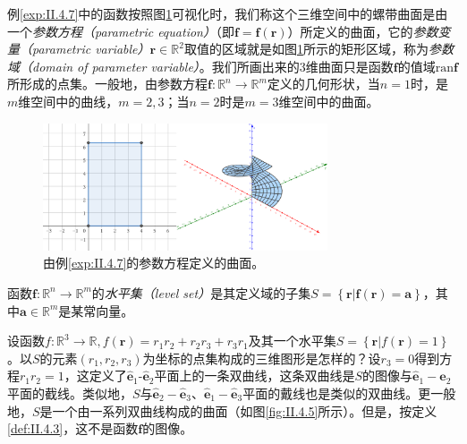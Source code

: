 \documentclass[main.tex]{subfiles}
\begin{document}
例\ref{exp:II.4.7}中的函数按照图\ref{fig:II.4.4}可视化时，我们称这个三维空间中的螺带曲面是由一个\emph{参数方程（parametric equation）}（即$\mathbf{f}=\mathbf{f}\left(\mathbf{r}\right)$）所定义的曲面，它的\emph{参数变量（parametric variable）}$\mathbf{r}\in\mathbb{R}^2$取值的区域就是如图\ref{fig:II.4.4}所示的矩形区域，称为\emph{参数域（domain of parameter variable）}。我们所画出来的3维曲面只是函数$\mathbf{f}$的值域$\mathrm{ran}\mathbf{f}$所形成的点集。一般地，由参数方程$\mathbf{f}:\mathbb{R}^n\rightarrow\mathbb{R}^m$定义的几何形状，当$n=1$时，是$m$维空间中的曲线，$m=2,3$；当$n=2$时是$m=3$维空间中的曲面。

\begin{figure}[h]
    \centering
    \includegraphics[width=0.75\textwidth]{images/II.4.4.png}
    \caption{由例\ref{exp:II.4.7}的参数方程定义的曲面。}
    \label{fig:II.4.4}
\end{figure}
\begin{definition}[函数的水平集]
    函数$\mathbf{f}:\mathbb{R}^n\rightarrow\mathbb{R}^m$的\emph{水平集（level set）}是其定义域的子集$S=\left\{\mathbf{r}|\mathbf{f}\left(\mathbf{r}\right)=\mathbf{a}\right\}$，其中$\mathbf{a}\in\mathbb{R}^m$是某常向量\cite[\S7.1] {华工高数2009下}。
\end{definition}
\begin{example}\label{exp:II.4.8}
    设函数$f:\mathbb{R}^3\rightarrow\mathbb{R},f\left(\mathbf{r}\right)=r_1r_2+r_2r_3+r_3r_1$及其一个水平集$S=\left\{\mathbf{r}|f\left(\mathbf{r}\right)=1\right\}$。以$S$的元素$\left(r_1,r_2,r_3\right)$为坐标的点集构成的三维图形是怎样的？设$r_3=0$得到方程$r_1r_2=1$，这定义了$\mathbf{\hat{e}}_1$-$\mathbf{\hat{e}}_2$平面上的一条双曲线，这条双曲线是$S$的图像与$\mathbf{\hat{e}}_1-\mathbf{\hat{e}}_2$平面的截线。类似地，$S$与$\mathbf{\hat{e}}_2-\mathbf{\hat{e}}_3$、$\mathbf{\hat{e}}_1-\mathbf{\hat{e}}_3$平面的戴线也是类似的双曲线。更一般地，$S$是一个由一系列双曲线构成的曲面（如图\ref{fig:II.4.5}所示）。但是，按定义\ref{def:II.4.3}，这不是函数$\mathbf{f}$的图像。
\end{example}
\end{document}
